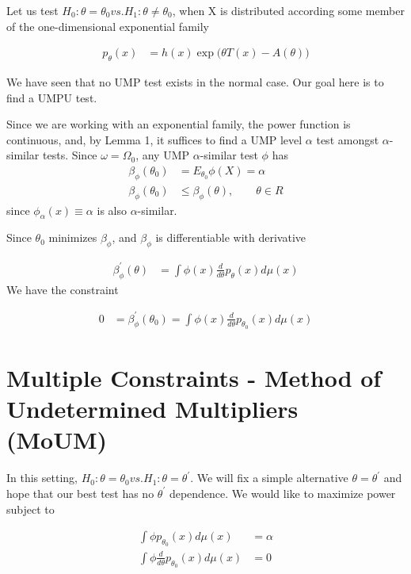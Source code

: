 \documentclass[11pt]{article} %
\begin{document}
Let us test $H_0: \theta = \theta_0 vs. H_1 : \theta \neq \theta_0$, when X is distributed according some member of the one-dimensional exponential family

\begin{align*}
	p_{\theta}(x) &= h(x) \exp \Big( \theta T(x) - A(\theta) \Big)
\end{align*}

We have seen that no UMP test exists in the normal case. Our goal here is to find a UMPU test.

Since we are working with an exponential family, the power function is continuous, and, by Lemma 1, it suffices to find a UMP level $\alpha$ test amongst $\alpha$-similar tests.
Since $\omega = \Omega_0$, any UMP $\alpha$-similar test $\phi$ has
\begin{align*}
	\beta_{\phi}(\theta_0) &= E_{\theta_0} \phi(X) = \alpha \\
	\beta_{\phi}(\theta_0) & \leq \beta_{\phi}(\theta), \qquad \theta \in R
\end{align*}
since $\phi_{\alpha} (x) \equiv \alpha$ is also $\alpha$-similar.

Since $\theta_0$ minimizes $\beta_{\phi}$, and $\beta_{\phi}$ is differentiable with derivative 

\begin{align*}
	\beta_{\phi}^{'}(\theta) &= \int \phi(x) \frac{d}{d \theta} p_{\theta} (x) d\mu(x) 
\end{align*}
We have the constraint 

\begin{align*}
	0 &= \beta^{'}_{\phi} (\theta_0) = \int \phi(x) \frac{d}{d \theta} p_{\theta_0}(x) d \mu(x)
\end{align*}	


\section{Multiple Constraints - Method of Undetermined Multipliers (MoUM)}

In this setting, $H_0: \theta = \theta_0 vs. H_1 : \theta = \theta^{'}$. We will fix a simple alternative $\theta = \theta^{'}$ and hope that our best test has no $\theta^{'}$ dependence. We would like to maximize power subject to

\begin{align*}
	\int \phi p_{\theta_0}(x)  d \mu(x) &= \alpha \\
	\int \phi \frac{d}{d\theta} p_{\theta_0}(x)  d \mu(x) &= 0
\end{align*}
\end{document}
